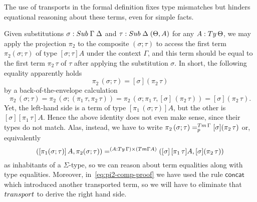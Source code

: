 \documentclass[a4paper,UKenglish,numberwithinsect,cleveref,thm-restate]{lipics-v2021}
\begin{document}
The use of transports in the formal definition fixes type mismatches but hinders equational reasoning about these terms, even for simple facts.
\begin{example}\label{ex:pi2-comp}
  Given substitutions $\sigma : \Sub\;\Gamma\; \Delta$ and $\tau : \Sub\;\Delta\;(\Theta, A)$ for any $A : \Ty\,\Theta$, we may apply the projection $\pi_2$ to the composite $(\sigma; \tau)$ to access the first term $\pi_2(\sigma; \tau)$ of type $[\sigma;\tau] A$ under the context $\Gamma$, and this term should be equal to the first term $\pi_2\,\tau$ of $\tau$ after applying the substitution $\sigma$. 
  In short, the following equality apparently holds
  \[
    \pi_2\,(\sigma ; \tau) = [\sigma] (\pi_2\,\tau)
  \]
  by a back-of-the-envelope calculation
  \begin{equation} \label{eq:pi2-comp-proof}
    \pi_2\,(\sigma ; \tau) 
    = \pi_2\,(\sigma; (\pi_1\,\tau, \pi_2\,\tau))
    = \pi_2\,(\sigma;\pi_1\,\tau, [\sigma]\,(\pi_2\,\tau))
    = [\sigma] (\pi_2\,\tau).
  \end{equation}
  Yet, the left-hand side is a term of type $[\pi_1\,(\sigma;\tau)] A$, but the other is $[\sigma] [\pi_1\,\tau] A$.
  Hence the above identity does not even make sense, since their types do not match.
  Alas, instead, we have to write $\pi_2\,(\sigma ; \tau) =^{\Tm\,\Gamma}_{p} [\sigma] (\pi_2\,\tau)$ or, equivalently
  \begin{equation}\label{eq:pi2-comp-real-proof}
    ([\pi_1(\sigma; \tau)]\,A, \pi_2(\sigma; \tau)) =^{(A : \Ty\,\Gamma) \times (\Tm \Gamma A)} ([\sigma]\,[\pi_1\,\tau]A, [\sigma] (\pi_2\,\tau))
  \end{equation}
  as inhabitants of a $\Sigma$-type, so we can reason about term equalities along with type equalities.
  Moreover, in~\eqref{eq:pi2-comp-proof} we have used the rule $\mathsf{concat}$ which introduced another transported term, so we will have to eliminate that $\transp$ to derive the right hand side.


\end{example}
\end{document}
